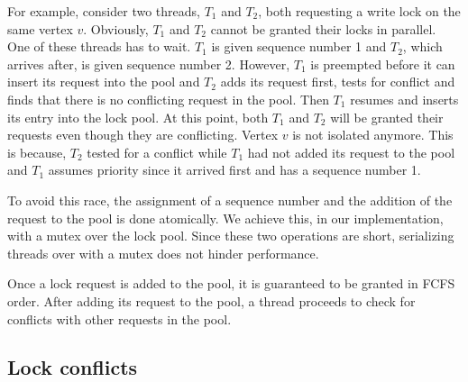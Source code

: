 For example, consider two threads, $T_1$ and $T_2$, both requesting a write lock on the same vertex $v$. Obviously, $T_1$ and $T_2$ cannot be granted their locks in parallel. One of these threads has to wait. $T_1$ is given sequence number 1 and $T_2$, which arrives after, is given sequence number 2. However, $T_1$ is preempted before it can insert its request into the pool and $T_2$ adds its request first, tests for conflict and finds that there is no conflicting request in the pool. Then $T_1$ resumes and inserts its entry into the lock pool. 
At this point, both $T_1$ and $T_2$ will be granted their requests even though they are conflicting. Vertex $v$ is not isolated anymore. This is because, $T_2$ tested for a conflict while $T_1$ had not added its request to the pool and $T_1$ assumes priority since it arrived first and has a sequence number 1.

To avoid this race, the assignment of a sequence number and the addition of the request to the pool is done atomically. We achieve this, in our implementation, with a mutex over the lock pool. Since these two operations are short, serializing threads over with a mutex does not hinder performance. 

Once a lock request is added to the pool, it is guaranteed to be granted in FCFS order. After adding its request to the pool, a thread proceeds to check for conflicts with other requests in the pool.



\subsection{Lock conflicts}


